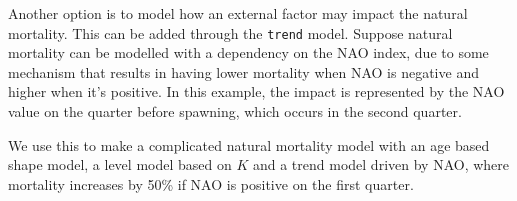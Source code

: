 \documentclass[
]{book}
\newenvironment{Shaded}{\begin{snugshade}}{\end{snugshade}}
\newcommand{\AttributeTok}[1]{\textcolor[rgb]{0.13,0.29,0.53}{#1}}
\newcommand{\CommentTok}[1]{\textcolor[rgb]{0.56,0.35,0.01}{\textit{#1}}}
\newcommand{\ConstantTok}[1]{\textcolor[rgb]{0.56,0.35,0.01}{#1}}
\newcommand{\DecValTok}[1]{\textcolor[rgb]{0.00,0.00,0.81}{#1}}
\newcommand{\FloatTok}[1]{\textcolor[rgb]{0.00,0.00,0.81}{#1}}
\newcommand{\FunctionTok}[1]{\textcolor[rgb]{0.13,0.29,0.53}{\textbf{#1}}}
\newcommand{\NormalTok}[1]{#1}
\newcommand{\OtherTok}[1]{\textcolor[rgb]{0.56,0.35,0.01}{#1}}
\newcommand{\SpecialCharTok}[1]{\textcolor[rgb]{0.81,0.36,0.00}{\textbf{#1}}}
\newcommand{\StringTok}[1]{\textcolor[rgb]{0.31,0.60,0.02}{#1}}
\begin{document}
Another option is to model how an external factor may impact the natural mortality. This can be added through the \texttt{trend} model. Suppose natural mortality can be modelled with a dependency on the NAO index, due to some mechanism that results in having lower mortality when NAO is negative and higher when it's positive. In this example, the impact is represented by the NAO value on the quarter before spawning, which occurs in the second quarter.

We use this to make a complicated natural mortality model with an age based shape model, a level model based on \(K\) and a trend model driven by NAO, where mortality increases by 50\% if NAO is positive on the first quarter.

\begin{Shaded}
\end{Shaded}
\end{document}
